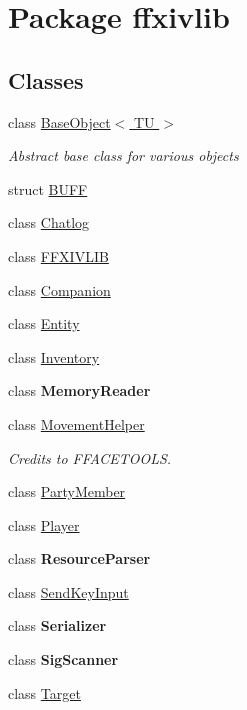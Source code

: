 \hypertarget{namespaceffxivlib}{\section{Package ffxivlib}
\label{namespaceffxivlib}
}
\subsection*{Classes}
\begin{DoxyCompactItemize}
\item 
class \hyperlink{classffxivlib_1_1_base_object_3_01_t_u_01_4}{Base\-Object$<$ T\-U $>$}
\begin{DoxyCompactList}\small\item\em Abstract base class for various objects \end{DoxyCompactList}\item 
struct \hyperlink{structffxivlib_1_1_b_u_f_f}{B\-U\-F\-F}
\item 
class \hyperlink{classffxivlib_1_1_chatlog}{Chatlog}
\item 
class \hyperlink{classffxivlib_1_1_f_f_x_i_v_l_i_b}{F\-F\-X\-I\-V\-L\-I\-B}
\item 
class \hyperlink{classffxivlib_1_1_companion}{Companion}
\item 
class \hyperlink{classffxivlib_1_1_entity}{Entity}
\item 
class \hyperlink{classffxivlib_1_1_inventory}{Inventory}
\item 
class {\bfseries Memory\-Reader}
\item 
class \hyperlink{classffxivlib_1_1_movement_helper}{Movement\-Helper}
\begin{DoxyCompactList}\small\item\em Credits to F\-F\-A\-C\-E\-T\-O\-O\-L\-S. \end{DoxyCompactList}\item 
class \hyperlink{classffxivlib_1_1_party_member}{Party\-Member}
\item 
class \hyperlink{classffxivlib_1_1_player}{Player}
\item 
class {\bfseries Resource\-Parser}
\item 
class \hyperlink{classffxivlib_1_1_send_key_input}{Send\-Key\-Input}
\item 
class {\bfseries Serializer}
\item 
class {\bfseries Sig\-Scanner}
\item 
class \hyperlink{classffxivlib_1_1_target}{Target}
\end{DoxyCompactItemize}
